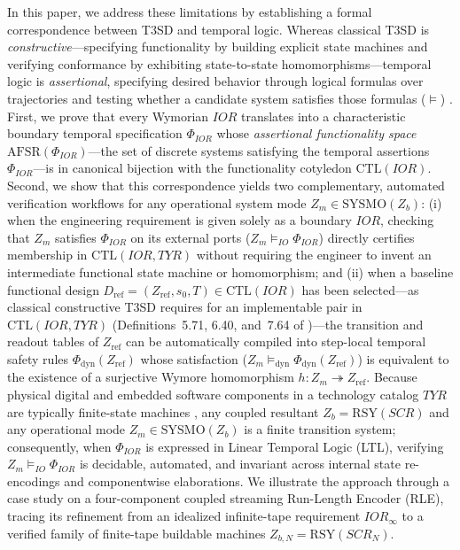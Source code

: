 In this paper, we address these limitations by establishing a formal correspondence between T3SD and temporal logic. Whereas classical T3SD is \emph{constructive}---specifying functionality by building explicit state machines and verifying conformance by exhibiting state-to-state homomorphisms---temporal logic is \emph{assertional}, specifying desired behavior through logical formulas over trajectories and testing whether a candidate system satisfies those formulas ($\models$) \citep{Pnueli1977,MannaPnueli1995}. First, we prove that every Wymorian $IOR$ translates into a characteristic boundary temporal specification $\Phi_{IOR}$ whose \emph{assertional functionality space} $\mathrm{AFSR}(\Phi_{IOR})$---the set of discrete systems satisfying the temporal assertions $\Phi_{IOR}$---is in canonical bijection with the functionality cotyledon $\mathrm{CTL}(IOR)$. Second, we show that this correspondence yields two complementary, automated verification workflows for any operational system mode $Z_m\in\mathrm{SYSMO}(Z_b)$:
(i) when the engineering requirement is given solely as a boundary $IOR$, checking that $Z_m$ satisfies $\Phi_{IOR}$ on its external ports ($Z_m\models_{IO}\Phi_{IOR}$) directly certifies membership in $\mathrm{CTL}(IOR,TYR)$ without requiring the engineer to invent an intermediate functional state machine or homomorphism; and
(ii) when a baseline functional design $D_{\mathrm{ref}}=(Z_{\mathrm{ref}},s_0,T)\in\mathrm{CTL}(IOR)$ has been selected---as classical constructive T3SD requires for an implementable pair in $\mathrm{CTL}(IOR,TYR)$ (Definitions~5.71, 6.40, and~7.64 of \citet{Wymore1993})---the transition and readout tables of $Z_{\mathrm{ref}}$ can be automatically compiled into step-local temporal safety rules $\Phi_{\mathrm{dyn}}(Z_{\mathrm{ref}})$ whose satisfaction ($Z_m\models_{\mathrm{dyn}}\Phi_{\mathrm{dyn}}(Z_{\mathrm{ref}})$) is equivalent to the existence of a surjective Wymore homomorphism $h:Z_m\twoheadrightarrow Z_{\mathrm{ref}}$. Because physical digital and embedded software components in a technology catalog $TYR$ are typically finite-state machines \citep{Wymore1993,BurchClarkeMcMillanDill1992,BaierKatoen2008}, any coupled resultant $Z_b=\mathrm{RSY}(SCR)$ and any operational mode $Z_m\in\mathrm{SYSMO}(Z_b)$ is a finite transition system; consequently, when $\Phi_{IOR}$ is expressed in Linear Temporal Logic (LTL), verifying $Z_m\models_{IO}\Phi_{IOR}$ is decidable, automated, and invariant across internal state re-encodings and componentwise elaborations. We illustrate the approach through a case study on a four-component coupled streaming Run-Length Encoder (RLE), tracing its refinement from an idealized infinite-tape requirement $IOR_\infty$ to a verified family of finite-tape buildable machines $Z_{b,N}=\mathrm{RSY}(SCR_N)$.

